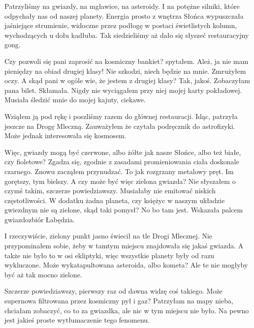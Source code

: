 Patrzyliśmy na gwiazdy, na mgławice, na asteroidy. I na potężne silniki, które odpychały nas od naszej planety.
Energia prosto z wnętrza Słońca wypuszczała jaśniejące strumienie, widoczne przez podłogę w postaci świetlistych kolumn, wychodzących u dołu kadłuba.
Tak siedzieliśmy aż dało się słyszeć restauracyjny gong.

\begin{dialogue}
	\ds{} Czy pozwoli się pani zaprosić na kosmiczny bankiet? \dm{} spytałem.
	\ds{} Ależ, ja nie mam pieniędzy na obiad drugiej klasy!
	\ds{} Nie szkodzi, niech będzie na mnie. \dm{} Zmrużyłem oczy. \dm{} A skąd pani w ogóle wie, że jestem z drugiej klasy?
	\ds{} Tak, jakoś. Zobaczyłam pana bilet. \dm{} Skłamała. Nigdy nie wyciągałem przy niej mojej karty pokładowej. Musiała śledzić mnie do mojej kajuty, ciekawe.
\end{dialogue}

Wziąłem ją pod rękę i poszliśmy razem do głównej restauracji.
Idąc, patrzyła jeszcze na Drogę Mleczną. Zauważyłem że czytała podręcznik do astrofizyki.
Może jednak interesowała się kosmosem.

\begin{dialogue}
	\ds{} Więc, gwiazdy mogą być czerwone, albo żółte jak nasze Słońce, albo też białe, czy fioletowe?
	\ds{} Zgadza się, zgodnie z zasadami promieniowania ciała doskonale czarnego. \dm{} Znowu zacząłem przynudzać. \dm{} To jak rozgrzany metalowy pręt.
		Im gorętszy, tym bielszy.
	\ds{} A czy może być więc zielona gwiazda?
	\ds{} Nie słyszałem o czymś takim, szczerze powiedziawszy. Musiałaby nie emitować niskich częstotliwości. 
		W dodatku żadna planeta, czy księżyc w naszym układzie gwiezdnym nie są zielone, skąd taki pomysł?
	\ds{} No bo tam jest. \dm{} Wskazała palcem gwiazdozbiór Łabędzia.
\end{dialogue}

I rzeczywiście, zielony punkt jasno świecił na tle Drogi Mlecznej.
Nie przypominałem sobie, żeby w tamtym miejscu znajdowała się jakaś gwiazda.
A także nie było to w osi ekliptyki, więc wszystkie planety były od razu wykluczone.
Może wykatapultowana asteroida, albo kometa?
Ale te nie mogłyby być aż tak mocno zielone.

\begin{dialogue}
	\ds{} Szczerze powiedziawszy, pierwszy raz od dawna widzę coś takiego. Może supernowa filtrowana przez kosmiczny pył i gaz?
	\ds{} Patrzyłam na mapy nieba, chciałam zobaczyć, co to za gwiazdka, ale nic w tym miejscu nie było.
	\ds{} Na pewno jest jakieś proste wytłumaczenie tego fenomenu.
\end{dialogue}

